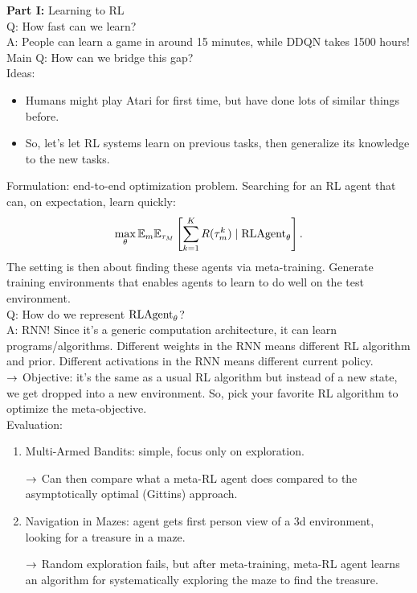 {\bf Part I:} Learning to RL \\

Q: How fast can we learn? \\

A: People can learn a game in around 15 minutes, while DDQN takes 1500 hours! \\

Main Q: How can we bridge this gap? \\

Ideas:
\begin{itemize}
    \item Humans might play Atari for first time, but have done lots of similar things before.
    \item So, let's let RL systems learn on previous tasks, then generalize its knowledge to the new tasks.
\end{itemize}

Formulation: end-to-end optimization problem. Searching for an RL agent that can, on expectation, learn quickly:
\[
\max_\theta \mathbb{E}_m \mathbb{E}_{\tau_M}\left[\sum_{k=1}^K R(\tau_m^k) \mid \text{RLAgent}_\theta\right].
\]
The setting is then about finding these agents via meta-training. Generate training environments that enables agents to learn to do well on the test environment. \\

Q: How do we represent $\text{RLAgent}_\theta$? \\

A: RNN! Since it's a generic computation architecture, it can learn programs/algorithms. Different weights in the RNN means different RL algorithm and prior. Different activations in the RNN means different current policy. \\

$\rightarrow$ Objective: it's the same as a usual RL algorithm but instead of a new state, we get dropped into a new environment. So, pick your favorite RL algorithm to optimize the meta-objective. \\

Evaluation:
\begin{enumerate}
    \item Multi-Armed Bandits: simple, focus only on exploration.
    
    $\rightarrow$ Can then compare what a meta-RL agent does compared to the asymptotically optimal (Gittins) approach.
    
    \item Navigation in Mazes: agent gets first person view of a 3d environment, looking for a treasure in a maze.
    
    $\rightarrow$ Random exploration fails, but after meta-training, meta-RL agent learns an algorithm for systematically exploring the maze to find the treasure.
\end{enumerate}


